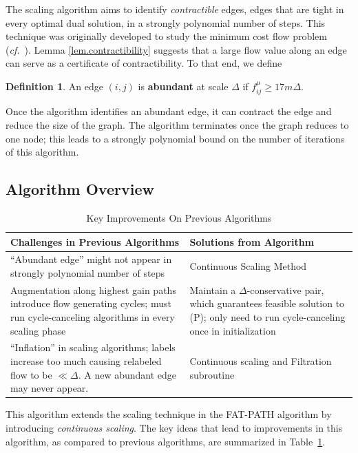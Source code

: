 \documentclass[11pt]{article}
\theoremstyle{definition}
\newtheorem{definition}{Definition}[section]
\theoremstyle{definition}
\begin{document}
	The scaling algorithm aims to identify \emph{contractible} edges,
	edges that are tight in every optimal dual solution,
    in a strongly polynomial number of steps. This technique was
    originally developed to study the minimum cost flow problem (\emph{cf.}~\cite{Orlin1988}).
	Lemma \ref{lem.contractibility} suggests that a large flow value along an edge can
    serve as a certificate of contractibility. To that end, we define
    \begin{definition}
    An edge $(i, j)$ is \textbf{abundant} at scale $\Delta$ if $f_{ij}^\mu \geq 17m\Delta$.
    \end{definition}
	Once the algorithm identifies an abundant edge,
	it can contract the edge and reduce the size of the graph. The algorithm
	terminates once the graph reduces to one node; this leads to a
	strongly polynomial bound on the number of iterations of this algorithm.

	\subsection{Algorithm Overview} 
	\begin{table}[H]
	\begin{center}
	    \begin{tabular}{ | p{7cm} | p{7cm} |}
	    \hline
	    Challenges in Previous Algorithms  & Solutions from Algorithm \\ \hline
	    ``Abundant edge'' might not appear in strongly polynomial number of steps \cite{Radzik2004} & Continuous Scaling Method  \\ \hline
	    Augmentation along highest gain paths introduce flow generating cycles; must run cycle-canceling algorithms in every scaling phase \cite{Goldberg:1991:CAG:105014.105022} & Maintain a $\Delta$-conservative pair, which guarantees feasible solution to (P); only need to run cycle-canceling once in initialization  \\ \hline
	    ``Inflation'' in scaling algorithms; labels increase too much causing relabeled flow to be $\ll \Delta$. A new abundant edge may never appear. & Continuous scaling and Filtration subroutine \\
	    \hline
	    \end{tabular}
	\end{center}
	\caption{Key Improvements On Previous Algorithms}
	\label{tab:improvementsInitial}
	\end{table}
	This algorithm extends the scaling technique in the FAT-PATH algorithm
    \cite{Goldberg:1991:CAG:105014.105022} by introducing \textit{continuous scaling}.
    The key ideas that lead to improvements in this algorithm, as compared to previous algorithms,
    are summarized in Table~\ref{tab:improvementsInitial}.
    
\end{document}
